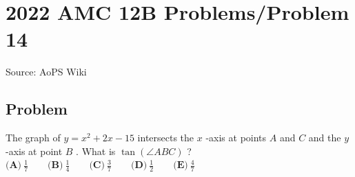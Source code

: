 \documentclass[12pt]{article}
\begin{document}
\section*{{2022 AMC 12B Problems/Problem 14}}
Source: AoPS Wiki

\subsection*{Problem}
The graph of $y=x^2+2x-15$ intersects the $x$ -axis at points $A$ and $C$ and the $y$ -axis at point $B$ . What is $\tan(\angle ABC)$ ? $\textbf{(A)}\ \frac{1}{7} \qquad \textbf{(B)}\ \frac{1}{4} \qquad \textbf{(C)}\ \frac{3}{7} \qquad \textbf{(D)}\ \frac{1}{2} \qquad \textbf{(E)}\ \frac{4}{7} \qquad$
\end{document}
